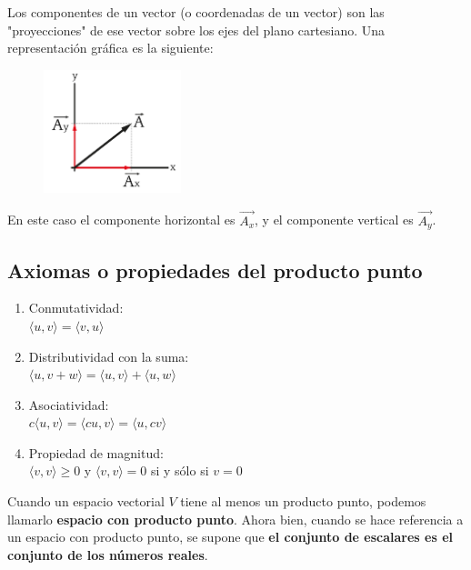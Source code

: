 \documentclass{article}
\begin{document}
    Los componentes de un vector (o coordenadas de un vector) son las "proyecciones" de ese vector sobre los ejes del plano cartesiano. Una representación gráfica es la siguiente:

    \begin{figure}[h]
        \centering
        \includegraphics[width=4cm]{img-1-componentes.png}
    \end{figure}

    En este caso el componente horizontal es $\vec{A_x}$, y el componente vertical es $\vec{A_y}$.

    \subsection{Axiomas o propiedades del producto punto}

    \begin{enumerate}

        \item Conmutatividad: \\
            $\langle u, v\rangle = \langle v, u\rangle$
        \item Distributividad con la suma: \\
            $\langle u, v + w\rangle = \langle u, v\rangle + \langle u, w\rangle$
        \item Asociatividad: \\
            $c\langle u, v\rangle=\langle c u, v\rangle=\langle u, c v\rangle$
        \item Propiedad de magnitud: \\
            $\langle v, v\rangle \geq 0$ y $\langle v, v\rangle = 0$ si y sólo si $v = 0$

    \end{enumerate}

    Cuando un espacio vectorial $V$ tiene al menos un producto punto, podemos llamarlo \textbf{espacio con producto punto}. Ahora bien, cuando se hace referencia a un espacio con producto punto, se supone que \textbf{el conjunto de escalares es el conjunto de los números reales}.

\end{document}
